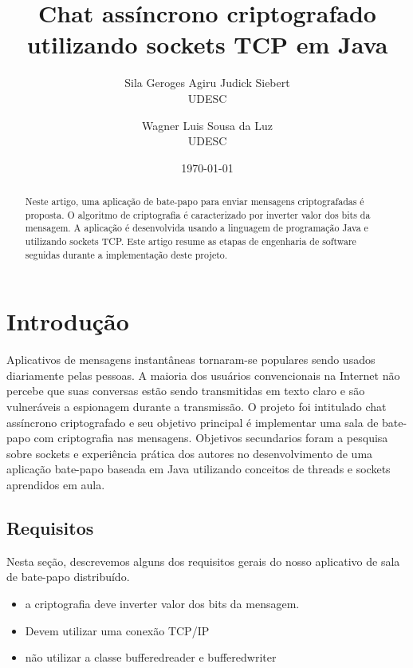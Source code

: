 \documentclass[a4paper,12pt]{article}
\title{Chat assíncrono criptografado utilizando  sockets TCP em Java}
\author{Sila Geroges Agiru Judick Siebert\\UDESC
        \and Wagner Luis Sousa da Luz \\UDESC}
\date{\today}
\begin{document}
\maketitle

\begin{abstract}
Neste artigo, uma aplicação de bate-papo para enviar mensagens  criptografadas é proposta.
O algoritmo de criptografia é caracterizado por inverter valor dos bits da mensagem. A aplicação é desenvolvida usando a linguagem de programação Java e utilizando sockets TCP. Este artigo resume as etapas de engenharia de software seguidas durante a implementação deste projeto.
\end{abstract}


\section{Introdução}
Aplicativos de mensagens instantâneas tornaram-se populares sendo usados diariamente pelas pessoas. A maioria dos usuários convencionais na Internet não percebe que suas conversas estão sendo transmitidas em texto claro e são vulneráveis a espionagem durante a transmissão.
O projeto foi intitulado  chat assíncrono criptografado e seu objetivo principal é implementar uma sala de bate-papo com criptografia nas mensagens. Objetivos secundarios foram a pesquisa sobre sockets e experiência prática dos autores no desenvolvimento de uma aplicação bate-papo baseada em Java utilizando conceitos de threads e sockets aprendidos em aula.
\subsection{Requisitos}
Nesta seção, descrevemos alguns dos requisitos gerais
do nosso aplicativo de sala de bate-papo distribuído.
\begin{itemize}
\item a criptografia deve inverter valor dos bits da mensagem.
\item Devem utilizar uma conexão TCP/IP
\item não utilizar a classe bufferedreader e bufferedwriter
\end{itemize}
\end{document}
